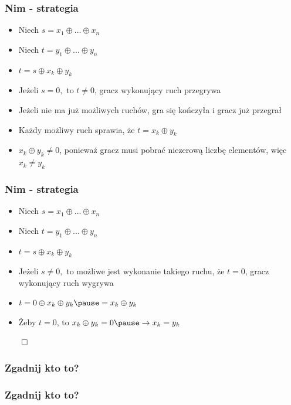 \documentclass[polish,envcountsect,10pt]{beamer}
\begin{document}
                \begin{frame}
                    \frametitle{Nim - strategia}
                    \begin{itemize}
                        \item<1-> Niech $s = x_1 \oplus ... \oplus x_n$
                        \item<1-> Niech $t = y_1 \oplus ... \oplus y_n$
                        \item<1-> $t = s \oplus x_k \oplus y_k$
                        \item<2-> Jeżeli $s = 0,$ to $t \neq 0$, gracz wykonujący ruch przegrywa
                        \item<3-> Jeżeli nie ma już możliwych ruchów, gra się kończyła i gracz już przegrał
                        \item<4-> Każdy możliwy ruch sprawia, że $t = x_k \oplus y_k$
                        \item<5-> $x_k \oplus y_k \neq 0$, ponieważ gracz musi pobrać niezerową liczbę elementów, więc $x_k \neq y_k$
                    \end{itemize}
                \end{frame}
                \begin{frame}
                    \frametitle{Nim - strategia}
                    \begin{itemize}
                        \item<1-> Niech $s = x_1 \oplus ... \oplus x_n$
                        \item<1-> Niech $t = y_1 \oplus ... \oplus y_n$
                        \item<1-> $t = s \oplus x_k \oplus y_k$
                        \item<2-> Jeżeli $s \neq 0,$ to możliwe jest wykonanie takiego ruchu, że $t = 0$, gracz wykonujący ruch wygrywa
                        \item<3-> $t = 0 \oplus x_k \oplus y_k \pause = x_k \oplus y_k$
                        \item<4-> Żeby $t = 0$, to $x_k \oplus y_k = 0 \pause \rightarrow x_k = y_k$ \pause
                    \end{itemize}
                    $\qed$
                \end{frame}
        \subsubsection{Zgadnij kto to?}
            \begin{frame}
                \frametitle{Zgadnij kto to?}
            \end{frame}
\end{document}
